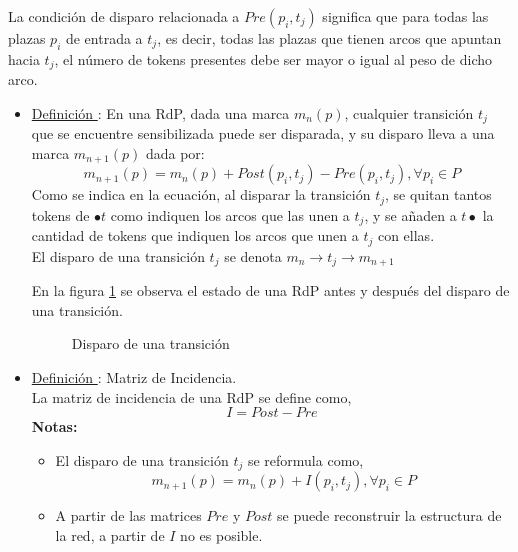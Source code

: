 La condición de disparo relacionada a $Pre(p_{i}, t_{j})$ significa que para
todas las plazas $p_{i}$ de entrada a $t_{j}$, es decir, todas las plazas que
tienen arcos que apuntan hacia $t_{j}$, el número de tokens presentes debe ser
mayor o igual al peso de dicho arco.

\begin{itemize}
  \item \underline{Definición \thedefinitionsCounter}: En una RdP, dada una marca $ m_{n}(p) $,
  cualquier transición $ t_{j} $ que se encuentre sensibilizada puede ser
  disparada, y su disparo lleva a una marca $ m_{n+1}(p)$ dada por:
  $$ m_{n+1}(p) = m_{n}(p) + Post(p_{i}, t_{j}) - Pre(p_{i}, t_{j}), \forall
  p_{i} \in P $$
  Como se indica en la ecuación, al disparar la transición $ t_{j} $, se quitan
  tantos tokens de $ \bullet t $ como indiquen los arcos que las unen a $ t_{j}
  $, y se añaden a $ t \bullet $ la cantidad de tokens que indiquen los arcos
  que unen a $ t_{j} $ con ellas.\\
  El disparo de una transición $ t_{j} $ se denota $ m_{n}\rightarrow t_{j}
  \rightarrow m_{n+1} $

  En la figura {\ref{fig:disparo_transicion}} se observa el estado de una RdP
  antes y después del disparo de una transición.
  \begin{figure}[h]
    \centering
    \caption{Disparo de una transición}
    \label{fig:disparo_transicion}
  \end{figure}
  
  \item \underline{Definición \thedefinitionsCounter}: Matriz de Incidencia.\\
  La matriz de incidencia de una RdP se define como,
  $$ I = Post - Pre $$
  \textbf{Notas:}
  \begin{itemize}
    \item El disparo de una transición $t_{j}$ se reformula como, $$ m_{n+1}(p)
    = m_{n}(p) + I(p_{i}, t_{j}), \forall p_{i} \in P $$
    \item A partir de las matrices $Pre$ y $Post$ se puede reconstruir la
    estructura de la red, a partir de $I$ no es posible.
  \end{itemize}
\end{itemize}

